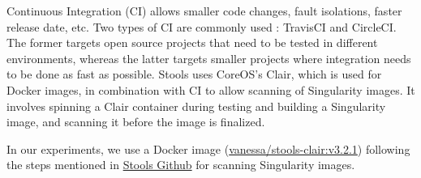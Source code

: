 \documentclass[a4paper,num-refs]{oup-contemporary}
\begin{document}
Continuous Integration (CI) allows smaller code changes, fault isolations,
faster release date, etc. Two types of CI are commonly used : TravisCI and
CircleCI. The former targets open source projects that need to be tested in
different environments, whereas the latter targets smaller projects where
integration needs to be done as fast as possible. Stools uses CoreOS's Clair, which
is used for Docker images, in combination with CI to allow scanning of
Singularity images.
It involves spinning a Clair container during testing and building a
Singularity image, and scanning it before the image is finalized.

In our experiments, we use a Docker image (\href{https://hub.docker.com/r/vanessa/stools-clair}{vanessa/stools-clair:v3.2.1})
following the steps mentioned in \href{https://github.com/singularityhub/stools}{Stools Github} for scanning
Singularity images.

\end{document}
